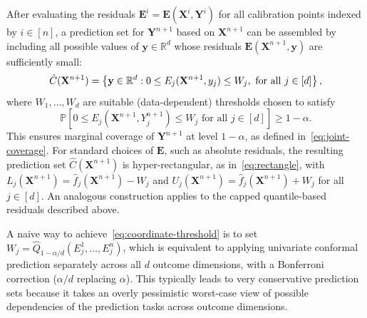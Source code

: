 After evaluating the residuals $\mathbf{E}^i = \mathbf E(\mathbf X^i, \mathbf Y^i)$ for all calibration points indexed by $i \in [n]$, a prediction set for $\mathbf{Y}^{n+1}$ based on $\mathbf{X}^{n+1}$ can be assembled by including all possible values of $\mathbf y \in \mathbb{R}^d$ whose residuals $\mathbf E(\mathbf{X}^{n+1}, \mathbf y)$ are sufficiently small:
\begin{equation}
    \hat{C}(\mathbf{X}^{n+1}) = \left\{\mathbf y \in \mathbb{R}^d: 0\leq E_j(\mathbf{X}^{n+1},y_j) \leq W_j, \text{ for all } j \in [d] \right\},
    \label{eq:joint-prediction}
\end{equation}
{\color{blue}where $W_1,\ldots,W_d$ are suitable (data-dependent) thresholds chosen to satisfy
\begin{equation}
    \mathbb{P} \left[0\leq E_j(\mathbf{X}^{n+1}, {Y}^{n+1}_j) \leq W_j \text{ for all } j \in [d] \right] \geq 1-\alpha.
    \label{eq:coordinate-threshold}
\end{equation}
This ensures marginal coverage of $\mathbf{Y}^{n+1}$ at level $1-\alpha$, as defined in~\eqref{eq:joint-coverage}. For standard choices of $\mathbf E$, such as absolute residuals, the resulting prediction set $\hat{C}(\mathbf{X}^{n+1})$ is hyper-rectangular, as in~\eqref{eq:rectangle}, with $L_j(\mathbf{X}^{n+1}) = \hat{f}_j(\mathbf{X}^{n+1}) - W_j$ and $U_j(\mathbf{X}^{n+1}) = \hat{f}_j(\mathbf{X}^{n+1}) + W_j$ for all $j \in [d]$. An analogous construction applies to the capped quantile-based residuals described above.}

A naive way to achieve~\eqref{eq:coordinate-threshold} is to set $W_j = \hat{Q}_{1-\alpha/d}({E}^1_j, \ldots ,E^n_j)$, which is equivalent to applying univariate conformal prediction separately across all $d$ outcome dimensions, with a Bonferroni correction ($\alpha/d$ replacing $\alpha$).
This typically leads to very conservative prediction sets because it takes an overly pessimistic worst-case view of possible dependencies of the prediction tasks across outcome dimensions.


